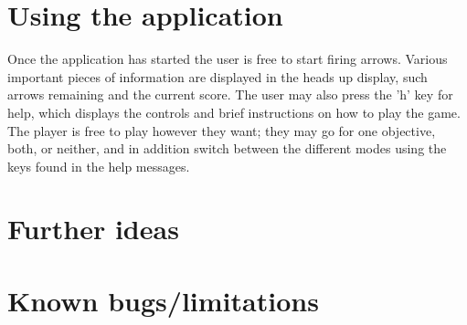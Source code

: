 \documentclass[8pt]{article}
\begin{document}
\section*{Using the application}
Once the application has started the user is free to start firing arrows.
Various important pieces of information are displayed in the heads up display,
such arrows remaining and the current score. The user may also press the 'h' key
for help, which displays the controls and brief instructions on how to play the
game. The player is free to play however they want; they may go for one
objective, both, or neither, and in addition switch between the different modes
using the keys found in the help messages.

\section*{Further ideas}
\section*{Known bugs/limitations}
\end{document}
